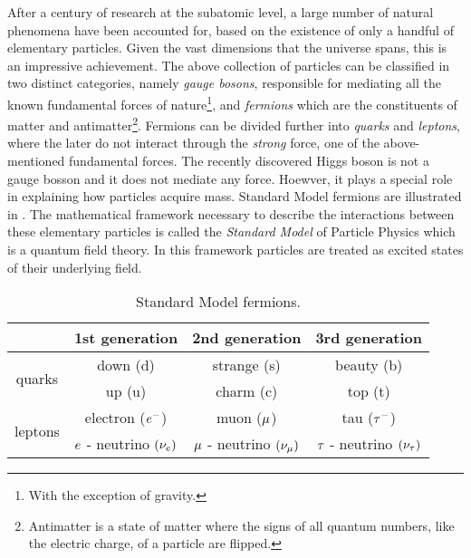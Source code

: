After a century of research at the subatomic level, a large number of natural phenomena have been accounted
for, based on the existence of only a handful of elementary particles. Given the vast dimensions that the
universe spans, this is an impressive achievement. The above collection of particles can be classified
in two distinct categories, namely {\it gauge bosons}, responsible for mediating all the known fundamental
forces of nature\footnote{With the exception of gravity.}, and {\it fermions} which are the constituents
of matter and antimatter\footnote{Antimatter is a state of matter where the signs of all quantum numbers,
like the electric charge, of a particle are flipped.}. Fermions can be divided further into {\it quarks}
and {\it leptons}, where the later do not interact through the {\it strong} force, one of the above-mentioned
fundamental forces. The recently discovered Higgs boson \cite{higgs-cms,higgs-atlas} is not a gauge bosson and
it does not mediate any force. Hoewver, it plays a special role in explaining how particles acquire mass.
Standard Model fermions are illustrated in . The mathematical framework necessary to
describe the interactions between these elementary particles is called the \textit{Standard Model} of Particle
Physics \cite{sm-glashow,sm-weinberg,sm-salam} which is a quantum field theory. In this framework particles are
treated as excited states of their underlying field.


\begin{table}[h!]
  \centering
 \begin{tabular}{cccc}
   \hline
                            &  1st generation                     &   2nd generation              &  3rd generation    \\
   \hline
   \multirow{2}{*}{quarks}  &  down (d)                           &   strange (s)                 &  beauty (b)        \\
                            &  up (u)                             &   charm (c)                   &  top (t)           \\
   \hline
   \multirow{2}{*}{leptons} &   electron ($e^-$)                  &   muon ($\mu$)               &  tau ($\tau^-$)     \\
                            &   $e$ - neutrino $(\nu_e)$  &  $\mu$ - neutrino $(\nu_\mu)$  &  $\tau$ - neutrino $(\nu_\tau)$  \\
   \hline
 \end{tabular}
 \caption{Standard Model fermions.}
 \label{quarksLeptons}
\end{table}

